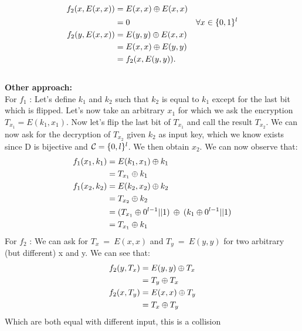 \begin{solution}
  \begin{align*}
    f_2(x, E(x,x)) & = E(x,x) \oplus E(x,x)\\
                   & = 0 & \forall x \in \{0,1\}^l\\
    f_2(y, E(x,x)) & = E(y,y) \oplus E(x,x)\\
                   & = E(x,x) \oplus E(y,y)\\
                   & = f_2(x, E(y,y)).
  \end{align*}
  \\
  \textbf{Other approach:}\\
  For $f_1$ : Let's define $k_1$ and $k_2$ such that $k_2$ is equal to $k_1$ except for the last bit which is flipped. Let's now take an arbitrary $x_1$ for which we ask the encryption $T_{x_1} = E(k_1,x_1)$. Now let's flip the last bit of $T_{x_1}$ and call the result $T_{x_2}$. We can now ask for the decryption of $T_{x_2}$ given $k_2$ as input key, which we know exists since D is bijective and $\mathcal{C} = \{0,l\}^{l}$. We then obtain $x_2$. We can now observe that:
  \begin{align*}
    f_1(x_1, k_1) & = E(k_1,x_1) \oplus k_1\\
                   & = T_{x_1}  \oplus k_1\\
    f_1(x_2, k_2) & = E(k_2,x_2) \oplus k_2\\
                   & = T_{x_2} \oplus k_2\\
                   & = (T_{x_1} \oplus 0^{l-1}||1 )\:\oplus\: (k_1 \oplus 0^{l-1}||1)\\
                   & = T_{x_1}  \oplus k_1\\
  \end{align*}
  For $f_2$ : We can ask for $T_x \:= \:E(x,x)$ and $T_y\: =\: E(y,y)$ for two arbitrary (but different) x and y.  We can see that:
  \begin{align*}
    f_2(y, T_x) & = E(y,y) \oplus T_x\\
                   & = T_y  \oplus T_x\\
    f_2(x, T_y) & = E(x,x) \oplus T_y\\
                   & = T_x \oplus T_y\\
  \end{align*}
  Which are both equal with different input, this is a collision
  
\end{solution}

